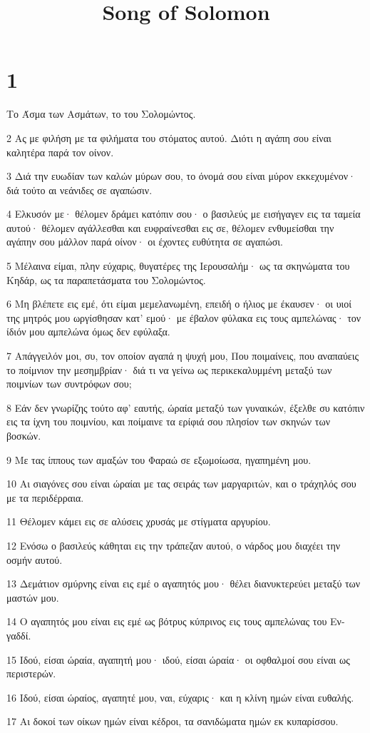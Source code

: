 

\title{Song of Solomon}


\chapter{1}

\par Το Άσμα των Ασμάτων, το του Σολομώντος.
\par 2 Ας με φιλήση με τα φιλήματα του στόματος αυτού. Διότι η αγάπη σου είναι καλητέρα παρά τον οίνον.
\par 3 Διά την ευωδίαν των καλών μύρων σου, το όνομά σου είναι μύρον εκκεχυμένον· διά τούτο αι νεάνιδες σε αγαπώσιν.
\par 4 Ελκυσόν με· θέλομεν δράμει κατόπιν σου· ο βασιλεύς με εισήγαγεν εις τα ταμεία αυτού· θέλομεν αγάλλεσθαι και ευφραίνεσθαι εις σε, θέλομεν ενθυμείσθαι την αγάπην σου μάλλον παρά οίνον· οι έχοντες ευθύτητα σε αγαπώσι.
\par 5 Μέλαινα είμαι, πλην εύχαρις, θυγατέρες της Ιερουσαλήμ· ως τα σκηνώματα του Κηδάρ, ως τα παραπετάσματα του Σολομώντος.
\par 6 Μη βλέπετε εις εμέ, ότι είμαι μεμελανωμένη, επειδή ο ήλιος με έκαυσεν· οι υιοί της μητρός μου ωργίσθησαν κατ' εμού· με έβαλον φύλακα εις τους αμπελώνας· τον ίδιόν μου αμπελώνα όμως δεν εφύλαξα.
\par 7 Απάγγειλόν μοι, συ, τον οποίον αγαπά η ψυχή μου, Που ποιμαίνεις, που αναπαύεις το ποίμνιον την μεσημβρίαν· διά τι να γείνω ως περικεκαλυμμένη μεταξύ των ποιμνίων των συντρόφων σου;
\par 8 Εάν δεν γνωρίζης τούτο αφ' εαυτής, ώραία μεταξύ των γυναικών, έξελθε συ κατόπιν εις τα ίχνη του ποιμνίου, και ποίμαινε τα ερίφιά σου πλησίον των σκηνών των βοσκών.
\par 9 Με τας ίππους των αμαξών του Φαραώ σε εξωμοίωσα, ηγαπημένη μου.
\par 10 Αι σιαγόνες σου είναι ώραίαι με τας σειράς των μαργαριτών, και ο τράχηλός σου με τα περιδέρραια.
\par 11 Θέλομεν κάμει εις σε αλύσεις χρυσάς με στίγματα αργυρίου.
\par 12 Ενόσω ο βασιλεύς κάθηται εις την τράπεζαν αυτού, ο νάρδος μου διαχέει την οσμήν αυτού.
\par 13 Δεμάτιον σμύρνης είναι εις εμέ ο αγαπητός μου· θέλει διανυκτερεύει μεταξύ των μαστών μου.
\par 14 Ο αγαπητός μου είναι εις εμέ ως βότρυς κύπρινος εις τους αμπελώνας του Εν-γαδδί.
\par 15 Ιδού, είσαι ώραία, αγαπητή μου· ιδού, είσαι ώραία· οι οφθαλμοί σου είναι ως περιστερών.
\par 16 Ιδού, είσαι ώραίος, αγαπητέ μου, ναι, εύχαρις· και η κλίνη ημών είναι ευθαλής.
\par 17 Αι δοκοί των οίκων ημών είναι κέδροι, τα σανιδώματα ημών εκ κυπαρίσσου.

